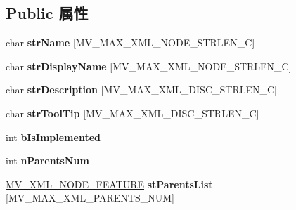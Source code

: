 \subsection*{Public 属性}
\begin{DoxyCompactItemize}
\item 
\mbox{\label{struct___m_v___x_m_l___f_e_a_t_u_r_e___enum_entry___a06c93d8d91995c891dc8cc92b788f2ae}} 
char {\bfseries str\+Name} \mbox{[}M\+V\+\_\+\+M\+A\+X\+\_\+\+X\+M\+L\+\_\+\+N\+O\+D\+E\+\_\+\+S\+T\+R\+L\+E\+N\+\_\+C\mbox{]}
\item 
\mbox{\label{struct___m_v___x_m_l___f_e_a_t_u_r_e___enum_entry___a38f4ed837b3d4eb2a182339adc26dc7b}} 
char {\bfseries str\+Display\+Name} \mbox{[}M\+V\+\_\+\+M\+A\+X\+\_\+\+X\+M\+L\+\_\+\+N\+O\+D\+E\+\_\+\+S\+T\+R\+L\+E\+N\+\_\+C\mbox{]}
\item 
\mbox{\label{struct___m_v___x_m_l___f_e_a_t_u_r_e___enum_entry___a39cef89fb45066c378d2dcde53659130}} 
char {\bfseries str\+Description} \mbox{[}M\+V\+\_\+\+M\+A\+X\+\_\+\+X\+M\+L\+\_\+\+D\+I\+S\+C\+\_\+\+S\+T\+R\+L\+E\+N\+\_\+C\mbox{]}
\item 
\mbox{\label{struct___m_v___x_m_l___f_e_a_t_u_r_e___enum_entry___a82c2c2e12d0f1b461d09a3af478781fb}} 
char {\bfseries str\+Tool\+Tip} \mbox{[}M\+V\+\_\+\+M\+A\+X\+\_\+\+X\+M\+L\+\_\+\+D\+I\+S\+C\+\_\+\+S\+T\+R\+L\+E\+N\+\_\+C\mbox{]}
\item 
\mbox{\label{struct___m_v___x_m_l___f_e_a_t_u_r_e___enum_entry___aff6436cb1a1dc6bb8f29e65959cf9b4a}} 
int {\bfseries b\+Is\+Implemented}
\item 
\mbox{\label{struct___m_v___x_m_l___f_e_a_t_u_r_e___enum_entry___a41dad4a487c4c3287cc1b2f94483298b}} 
int {\bfseries n\+Parents\+Num}
\item 
\mbox{\label{struct___m_v___x_m_l___f_e_a_t_u_r_e___enum_entry___a9d3d8961d4eee98656ec383210693531}} 
\hyperlink{struct___m_v___x_m_l___n_o_d_e___f_e_a_t_u_r_e__}{M\+V\+\_\+\+X\+M\+L\+\_\+\+N\+O\+D\+E\+\_\+\+F\+E\+A\+T\+U\+RE} {\bfseries st\+Parents\+List} \mbox{[}M\+V\+\_\+\+M\+A\+X\+\_\+\+X\+M\+L\+\_\+\+P\+A\+R\+E\+N\+T\+S\+\_\+\+N\+UM\mbox{]}

\end{DoxyCompactItemize}
